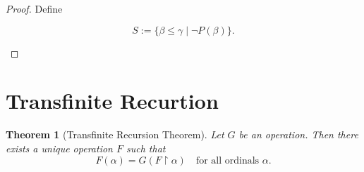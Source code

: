 \documentclass[10pt,a4paper]{book}
\let\emptyset\varnothing
\newtheorem{theorem}{Theorem}[section]
\begin{document}
\begin{proof}

    Define

    \[
        S:=\{\beta\le\gamma\mid \neg P(\beta)\}.
    \]

    \begin{fitchproof}[arrayenv=tabular]

        \open
         
         
        \have{3}{S\neq\emptyset} 
         
         
         
         
         
         
        \close
         

    \end{fitchproof}

\end{proof}

\section{Transfinite Recurtion}

\begin{theorem}[Transfinite Recursion Theorem]
    Let $G$ be an operation. Then there exists a unique operation $F$ such that
    \[
        F(\alpha)=G(F\upharpoonright \alpha)
        \quad \text{for all ordinals } \alpha.
    \]
\end{theorem}
\end{document}
